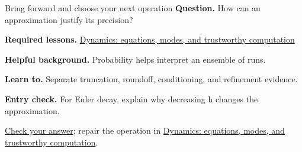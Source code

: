 \begin{learningcard}{Bring forward and choose your next operation}
\textsf{\textbf{Question.}} How can an approximation justify its precision?\par
\textbf{Required lessons.} \hyperref[learn:dynamics]{Dynamics: equations, modes, and trustworthy computation}\par
\textbf{Helpful background.} Probability helps interpret an ensemble of runs.\par
\textbf{Learn to.} Separate truncation, roundoff, conditioning, and refinement evidence.\par
\textbf{Entry check.} For Euler decay, explain why decreasing h changes the approximation.\par
\hyperref[solution:entry:numerical]{Check your answer}; repair the operation in \hyperref[learn:dynamics]{Dynamics: equations, modes, and trustworthy computation}.
\end{learningcard}
